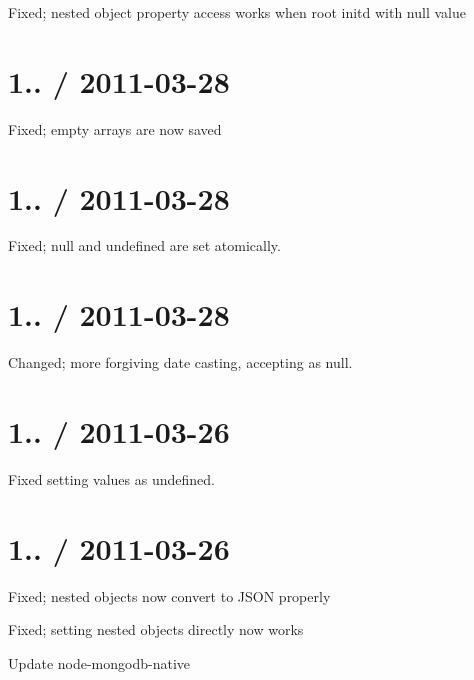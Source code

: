 \begin{DoxyItemize}
\item Fixed; nested object property access works when root initd with null value
\end{DoxyItemize}

\section*{1.. / 2011-\/03-\/28 }


\begin{DoxyItemize}
\item Fixed; empty arrays are now saved
\end{DoxyItemize}

\section*{1.. / 2011-\/03-\/28 }


\begin{DoxyItemize}
\item Fixed; {\ttfamily null} and {\ttfamily undefined} are set atomically.
\end{DoxyItemize}

\section*{1.. / 2011-\/03-\/28 }


\begin{DoxyItemize}
\item Changed; more forgiving date casting, accepting \textquotesingle{}\textquotesingle{} as null.
\end{DoxyItemize}

\section*{1.. / 2011-\/03-\/26 }


\begin{DoxyItemize}
\item Fixed setting values as {\ttfamily undefined}.
\end{DoxyItemize}

\section*{1.. / 2011-\/03-\/26 }


\begin{DoxyItemize}
\item Fixed; nested objects now convert to J\+S\+ON properly
\item Fixed; setting nested objects directly now works
\item Update node-\/mongodb-\/native
\end{DoxyItemize}

